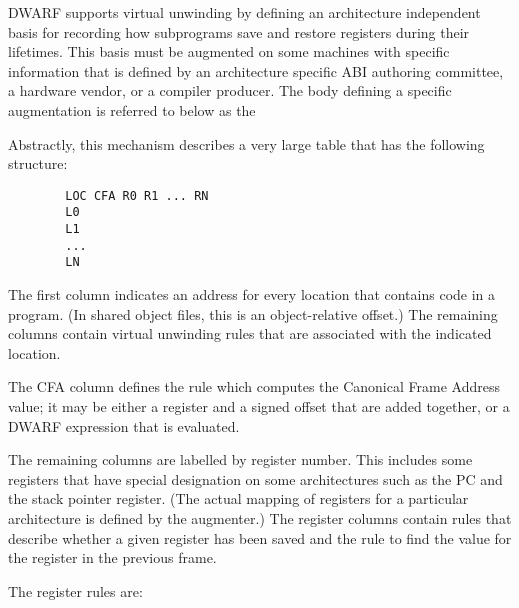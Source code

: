 DWARF supports virtual unwinding by defining an architecture
independent basis for recording how subprograms save and restore
registers during their lifetimes. This basis must be augmented
on some machines with specific information that is defined by
an architecture specific ABI authoring committee, a hardware
vendor, or a compiler producer. The body defining a specific
augmentation is referred to below as the 

Abstractly, this mechanism describes a very large table that
has the following structure:

\begin{verbatim}
        LOC CFA R0 R1 ... RN
        L0
        L1
        ...
        LN
\end{verbatim}


The first column indicates an address for every location
that contains code in a program. (In shared object files, this
is an object-relative offset.) The remaining columns contain
virtual unwinding rules that are associated with the indicated
location.

The CFA column defines the rule which computes the Canonical
Frame Address value; it may be either a register and a signed
offset that are added together, or a DWARF expression that
is evaluated.

The remaining columns are labelled by register number. This
includes some registers that have special designation on
some architectures such as the PC and the stack pointer
register. (The actual mapping of registers for a particular
architecture is defined by the augmenter.) The register columns
contain rules that describe whether a given register has been
saved and the rule to find the value for the register in the
previous frame.

The register rules are:

